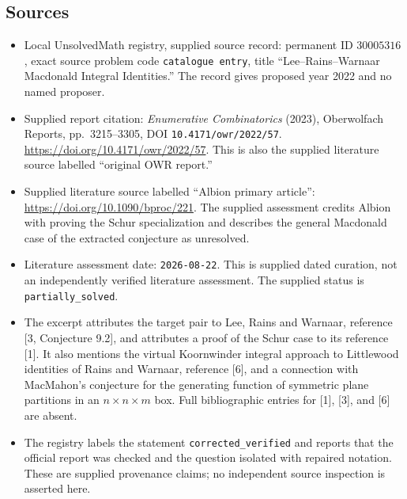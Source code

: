 \documentclass[11pt]{article}
\begin{document}
\subsection{Sources}
\begin{itemize}
\item Local UnsolvedMath registry, supplied source record: permanent ID \(30005316\), exact source problem code \texttt{catalogue entry}, title ``Lee--Rains--Warnaar Macdonald Integral Identities.'' The record gives proposed year 2022 and no named proposer.
\item Supplied report citation: \emph{Enumerative Combinatorics} (2023), Oberwolfach Reports, pp.\ 3215--3305, DOI \texttt{10.4171/owr/2022/57}. \url{https://doi.org/10.4171/owr/2022/57}. This is also the supplied literature source labelled ``original OWR report.''
\item Supplied literature source labelled ``Albion primary article'': \url{https://doi.org/10.1090/bproc/221}. The supplied assessment credits Albion with proving the Schur specialization and describes the general Macdonald case of the extracted conjecture as unresolved.
\item Literature assessment date: \texttt{2026-08-22}. This is supplied dated curation, not an independently verified literature assessment. The supplied status is \texttt{partially\_solved}.
\item The excerpt attributes the target pair to Lee, Rains and Warnaar, reference [3, Conjecture 9.2], and attributes a proof of the Schur case to its reference [1]. It also mentions the virtual Koornwinder integral approach to Littlewood identities of Rains and Warnaar, reference [6], and a connection with MacMahon's conjecture for the generating function of symmetric plane partitions in an \(n\times n\times m\) box. Full bibliographic entries for [1], [3], and [6] are absent.
\item The registry labels the statement \texttt{corrected\_verified} and reports that the official report was checked and the question isolated with repaired notation. These are supplied provenance claims; no independent source inspection is asserted here.
\end{itemize}
\end{document}
